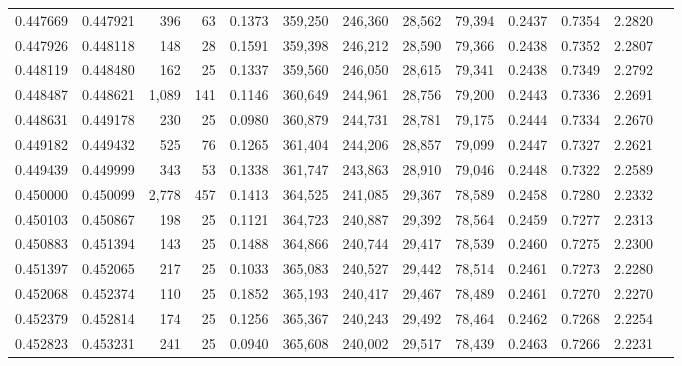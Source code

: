 \begin{tabular}{rrrrrrrrrrrrr}
0.447669 & 0.447921 &   396 &  63 &                                     0.1373 & 359,250 & 246,360 &  28,562 &  79,394 & 0.2437 & 0.7354 & 2.2820 \\
0.447926 & 0.448118 &   148 &  28 &                                     0.1591 & 359,398 & 246,212 &  28,590 &  79,366 & 0.2438 & 0.7352 & 2.2807 \\
0.448119 & 0.448480 &   162 &  25 &                                     0.1337 & 359,560 & 246,050 &  28,615 &  79,341 & 0.2438 & 0.7349 & 2.2792 \\
0.448487 & 0.448621 & 1,089 & 141 &                                     0.1146 & 360,649 & 244,961 &  28,756 &  79,200 & 0.2443 & 0.7336 & 2.2691 \\
0.448631 & 0.449178 &   230 &  25 &                                     0.0980 & 360,879 & 244,731 &  28,781 &  79,175 & 0.2444 & 0.7334 & 2.2670 \\
0.449182 & 0.449432 &   525 &  76 &                                     0.1265 & 361,404 & 244,206 &  28,857 &  79,099 & 0.2447 & 0.7327 & 2.2621 \\
0.449439 & 0.449999 &   343 &  53 &                                     0.1338 & 361,747 & 243,863 &  28,910 &  79,046 & 0.2448 & 0.7322 & 2.2589 \\
0.450000 & 0.450099 & 2,778 & 457 &                                     0.1413 & 364,525 & 241,085 &  29,367 &  78,589 & 0.2458 & 0.7280 & 2.2332 \\
0.450103 & 0.450867 &   198 &  25 &                                     0.1121 & 364,723 & 240,887 &  29,392 &  78,564 & 0.2459 & 0.7277 & 2.2313 \\
0.450883 & 0.451394 &   143 &  25 &                                     0.1488 & 364,866 & 240,744 &  29,417 &  78,539 & 0.2460 & 0.7275 & 2.2300 \\
0.451397 & 0.452065 &   217 &  25 &                                     0.1033 & 365,083 & 240,527 &  29,442 &  78,514 & 0.2461 & 0.7273 & 2.2280 \\
0.452068 & 0.452374 &   110 &  25 &                                     0.1852 & 365,193 & 240,417 &  29,467 &  78,489 & 0.2461 & 0.7270 & 2.2270 \\
0.452379 & 0.452814 &   174 &  25 &                                     0.1256 & 365,367 & 240,243 &  29,492 &  78,464 & 0.2462 & 0.7268 & 2.2254 \\
0.452823 & 0.453231 &   241 &  25 &                                     0.0940 & 365,608 & 240,002 &  29,517 &  78,439 & 0.2463 & 0.7266 & 2.2231 \\

\end{tabular}
